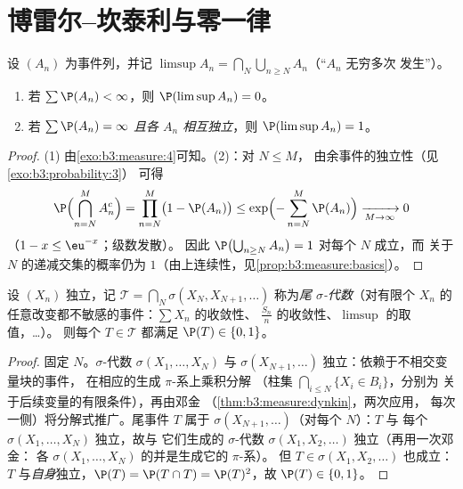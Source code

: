 \section{博雷尔--坎泰利与零一律}

\begin{theorem}
\label{thm:b3:probability:borelcantelli}
设 $(A_n)$ 为事件列，并记 $\limsup A_n = \bigcap_N
\bigcup_{n\geq N}A_n$（“$A_n$ 无穷多次
发生”）。
\begin{enumerate}
  \item 若 $\sum\P(A_n) < \infty$，则 $\P(\limsup A_n) =
        0$。
  \item 若 $\sum\P(A_n) = \infty$ \emph{且各 $A_n$
        相互独立}，则 $\P(\limsup A_n) = 1$。
\end{enumerate}
\end{theorem}

\begin{proof}
(1) 由\cref{exo:b3:measure:4}可知。(2)：对 $N \leq M$，
由余事件的独立性（见\cref{exo:b3:probability:3}）
可得
\[
\P\Bigl(\bigcap_{n=N}^{M}A_n^c\Bigr) = \prod_{n=N}^M\bigl(1
- \P(A_n)\bigr) \leq
\exp\Bigl(-\sum_{n=N}^M\P(A_n)\Bigr) \xrightarrow[M \to
\infty]{} 0
\]
（$1 - x \leq \eu^{-x}$；级数发散）。
因此 $\P\bigl(\bigcup_{n\geq N}A_n\bigr) = 1$ 对每个 $N$ 成立，而
关于 $N$ 的递减交集的概率仍为
$1$（由上连续性，见\cref{prop:b3:measure:basics}）。
\end{proof}

\begin{theorem}[柯尔莫哥洛夫 0--1 律]
\label{thm:b3:probability:zeroone}
设 $(X_n)$ 独立，记 $\mathcal T =
\bigcap_N\sigma(X_N, X_{N+1}, \dots)$ 称为\emph{尾
$\sigma$-代数}（对有限个
$X_n$ 的任意改变都不敏感的事件：$\sum X_n$ 的收敛性、
$\frac{S_n}n$ 的收敛性、$\limsup$ 的取值，\dots）。
则每个 $T \in \mathcal T$ 都满足 $\P(T) \in \{0,
1\}$。
\end{theorem}

\begin{proof}
固定 $N$。$\sigma$-代数 $\sigma(X_1, \dots, X_N)$ 与
$\sigma(X_{N+1}, \dots)$ 独立：依赖于不相交变量块的事件，
在相应的生成 $\pi$-系上乘积分解
（柱集 $\bigcap_{i\leq N}\{X_i \in B_i\}$，分别为
关于后续变量的有限条件），再由邓金
（\cref{thm:b3:measure:dynkin}，两次应用，
每次一侧）将分解式推广。尾事件 $T$ 属于
$\sigma(X_{N+1}, \dots)$（对每个 $N$）：$T$ 与
每个 $\sigma(X_1, \dots, X_N)$ 独立，故与
它们生成的 $\sigma$-代数 $\sigma(X_1, X_2, \dots)$ 独立（再用一次邓金：
各 $\sigma(X_1,\dots,X_N)$ 的并是生成它的 $\pi$-系）。
但 $T \in \sigma(X_1, X_2, \dots)$ 也成立：$T$
与\emph{自身}独立，$\P(T) = \P(T\cap T) =
\P(T)^2$，故 $\P(T) \in \{0, 1\}$。
\end{proof}

